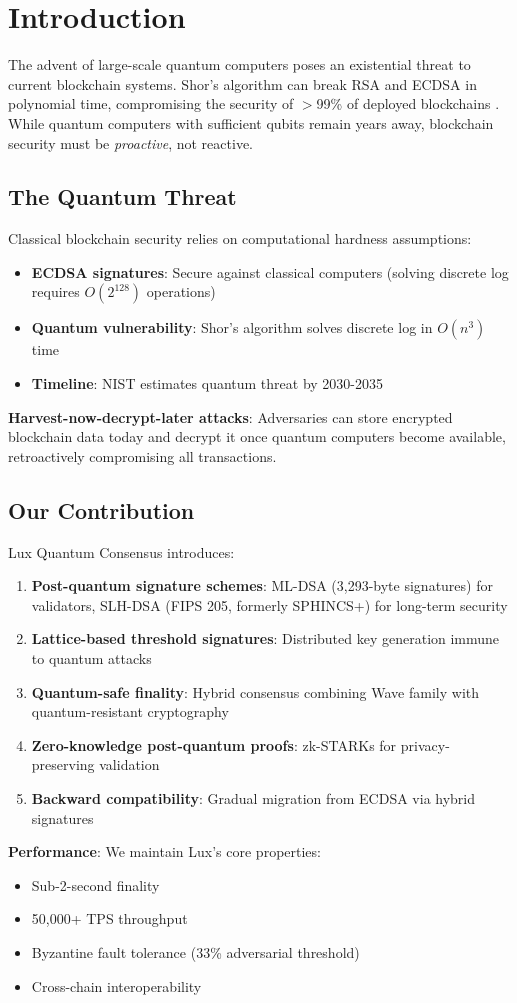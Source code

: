 \section{Introduction}


The advent of large-scale quantum computers poses an existential threat to current blockchain systems. Shor's algorithm can break RSA and ECDSA in polynomial time, compromising the security of $>$99\% of deployed blockchains \cite{shor1997}. While quantum computers with sufficient qubits remain years away, blockchain security must be \emph{proactive}, not reactive.

\subsection{The Quantum Threat}

Classical blockchain security relies on computational hardness assumptions:
\begin{itemize}
    \item \textbf{ECDSA signatures}: Secure against classical computers (solving discrete log requires $O(2^{128})$ operations)
    \item \textbf{Quantum vulnerability}: Shor's algorithm solves discrete log in $O(n^3)$ time
    \item \textbf{Timeline}: NIST estimates quantum threat by 2030-2035 \cite{nist2022}
\end{itemize}

\textbf{Harvest-now-decrypt-later attacks}: Adversaries can store encrypted blockchain data today and decrypt it once quantum computers become available, retroactively compromising all transactions.

\subsection{Our Contribution}

Lux Quantum Consensus introduces:

\begin{enumerate}
    \item \textbf{Post-quantum signature schemes}: ML-DSA (3,293-byte signatures) for validators, SLH-DSA (FIPS 205, formerly SPHINCS+) for long-term security
    \item \textbf{Lattice-based threshold signatures}: Distributed key generation immune to quantum attacks
    \item \textbf{Quantum-safe finality}: Hybrid consensus combining Wave family with quantum-resistant cryptography
    \item \textbf{Zero-knowledge post-quantum proofs}: zk-STARKs for privacy-preserving validation
    \item \textbf{Backward compatibility}: Gradual migration from ECDSA via hybrid signatures
\end{enumerate}

\textbf{Performance}: We maintain Lux's core properties:
\begin{itemize}
    \item Sub-2-second finality
    \item 50,000+ TPS throughput
    \item Byzantine fault tolerance (33\% adversarial threshold)
    \item Cross-chain interoperability
\end{itemize}


